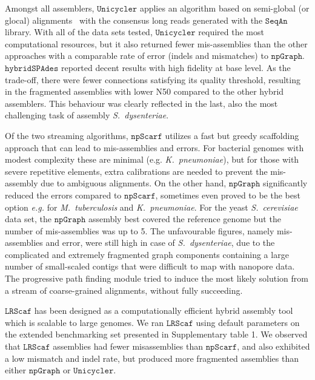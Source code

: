\documentclass[10pt,letterpaper]{article}
\newcommand{\npscarf}{$\mathtt{npScarf}$}
\newcommand{\npgraph}{$\mathtt{npGraph}$}
\newcommand{\unicycler}{$\mathtt{Unicycler}$}
\newcommand{\lrscaf}{$\mathtt{LRScaf}$}
\newcommand{\kp}{\emph{K.~pneumoniae}}
\newcommand{\EG}{\emph{e.g.}}
\begin{document}
Amongst all assemblers, \unicycler{} applies an algorithm based on semi-global (or glocal) alignments~\cite{Brudno2003glocal} with the consensus long reads generated with the $\mathtt{SeqAn}$ library. With all of the data sets tested, \unicycler{} required the most computational resources, but it also returned  fewer mis-assemblies than the other approaches with a comparable rate of error (indels and mismatches) to \npgraph{}.
$\mathtt{hybridSPAdes}$ reported decent results with high fidelity at base level. As the trade-off, there were fewer connections satisfying its quality threshold, resulting in the fragmented assemblies with lower N50 compared to the other hybrid assemblers. This behaviour was clearly reflected in the last, also the most challenging task of assembly \emph{S.~dysenteriae}.

Of the two streaming algorithms, \npscarf{} utilizes a fast but greedy scaffolding approach that can lead to mis-assemblies and errors.
For bacterial genomes with modest complexity these are minimal (e.g. \kp), but for those with severe repetitive elements, extra calibrations are needed to prevent the mis-assembly due to ambiguous alignments.
On the other hand, \npgraph{} significantly reduced the errors compared to \npscarf{}, sometimes even proved to be the best option \EG{} for \emph{M.~tuberculosis} and \kp{}.  
For the yeast \emph{S.~cerevisiae} data set, the \npgraph{} assembly best covered the reference genome but the number of mis-assemblies was up to 5.
The unfavourable figures, namely mis-assemblies and error, were still high in case of \emph{S.~dysenteriae}, 
 due to the complicated and extremely fragmented graph components containing a large number of small-scaled contigs that were difficult to map with nanopore data. The progressive path finding module tried to induce the most likely solution from a stream of coarse-grained alignments, without fully succeeding. 

\lrscaf{} has been designed as a computationally efficient hybrid assembly tool which is scalable to large genomes.  We ran \lrscaf{} using default parameters on the extended benchmarking set presented in Supplementary table 1.  We observed that  \lrscaf{} assemblies had fewer misassemblies than \npscarf{}, and also exhibited a low mismatch and indel rate, but produced more fragmented assemblies than either \npgraph{} or \unicycler{}.
\end{document}
